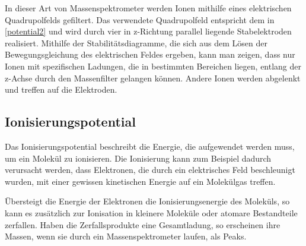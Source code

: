 \documentclass[10pt,a4paper]{article}
\begin{document}
In dieser Art von Massenspektrometer werden Ionen mithilfe eines elektrischen Quadrupolfelds gefiltert. Das verwendete Quadrupolfeld entspricht dem in \eqref{potential2} und wird durch vier in z-Richtung parallel liegende Stabelektroden realisiert. Mithilfe der Stabilitätsdiagramme, die sich aus dem Lösen der Bewegungsgleichung des elektrischen Feldes ergeben, kann man zeigen, dass nur Ionen mit spezifischen Ladungen, die in bestimmten Bereichen liegen, entlang der z-Achse durch den Massenfilter gelangen können. Andere Ionen werden abgelenkt und treffen auf die Elektroden.

\subsection{Ionisierungspotential}

Das Ionisierungspotential beschreibt die Energie, die aufgewendet werden muss, um ein Molekül zu ionisieren. Die Ionisierung kann zum Beispiel dadurch verursacht werden, dass Elektronen, die durch ein elektrisches Feld beschleunigt wurden, mit einer gewissen kinetischen Energie auf ein Molekülgas treffen.

Übersteigt die Energie der Elektronen die Ionisierungsenergie des Moleküls, so kann es zusätzlich zur Ionisation in kleinere Moleküle oder atomare Bestandteile zerfallen. Haben die Zerfallsprodukte eine Gesamtladung, so erscheinen ihre Massen, wenn sie durch ein Massenspektrometer laufen, als Peaks. 
\end{document}
